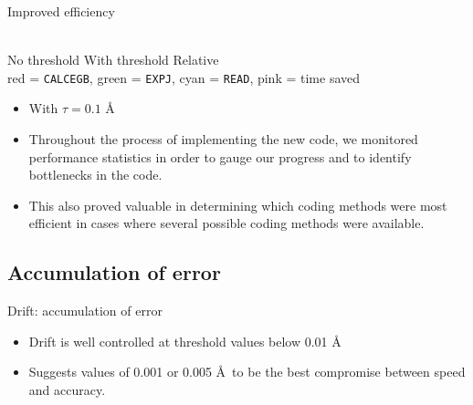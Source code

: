 \documentclass[10pt]{beamer}
\begin{document}
\begin{frame}[t]{Improved efficiency}

\vspace*{-1cm}
\begin{center}
\hspace*{-.85cm}\scalebox{.5}{\hspace*{-5.2cm}\hspace*{-5.2cm}}\\
 No threshold \hspace*{1.1cm} With threshold \hspace*{1.7cm} Relative \\
{\small red = \texttt{CALCEGB}, green = \texttt{EXPJ}, cyan = \texttt{READ}, pink = time saved}
\end{center}

\begin{itemize}
    \item With $\tau = 0.1$ \AA
    \item Throughout the process of implementing the new code, we monitored performance statistics in order to gauge our progress and to identify bottlenecks in the code.  
    \item This also proved valuable in determining which coding methods were most efficient in cases where several possible coding methods were available. 
\end{itemize}

\end{frame}

\subsection{Accumulation of error}


\begin{frame}[t]{Drift: accumulation of error}

\begin{center}
\scalebox{.75}{}
\end{center}

\begin{itemize}
    \item Drift is well controlled at threshold values below 0.01 \AA
    \item Suggests values of 0.001 or 0.005 \AA\ to be the best compromise between speed and accuracy.
\end{itemize}

\end{frame}
\end{document}
